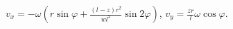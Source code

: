 $v_x= -\omega\left( r\sin{\varphi}+\frac{(l-z)r^2}{wl^2}\sin{2\varphi}\right)$,
$v_y = \frac{zr}{l}\omega\cos{\varphi}$.
